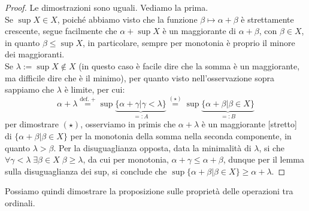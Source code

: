 \begin{proof}
	Le dimostrazioni sono uguali. Vediamo la prima.\\
	Se $\sup X \in X$, poich\'e abbiamo visto che la funzione $\beta \mapsto \alpha + \beta$ \`e strettamente crescente, segue facilmente che $\alpha + \sup X$ \`e un maggiorante di $\alpha + \beta$, con $\beta \in X$, in quanto $\beta \leq \sup X$, in particolare, sempre per monotonia \`e proprio il minore dei maggioranti.\\
	Se $\lambda := \sup X \not \in X$ (in questo caso \`e facile dire che la somma \`e un maggiorante, ma difficile dire che \`e il minimo), per quanto visto nell'osservazione sopra sappiamo che $\lambda$ \`e limite, per cui:
	\[ \alpha + \lambda \overset{\text{def. +}}{=} \sup\underbrace{\{\alpha + \gamma | \gamma < \lambda\}}_{=:A} \overset{(\star)}{=} \sup\underbrace{\{\alpha + \beta | \beta \in X\}}_{=:B}
		\]
	per dimostrare $(\star)$, osserviamo in primis che $\alpha + \lambda$ \`e un maggiorante [stretto] di $\{\alpha + \beta | \beta \in X\}$ per la monotonia della somma nella seconda componente, in quanto $\lambda > \beta$.
	Per la disuguaglianza opposta, data la minimalit\`a di $\lambda$, si che $\forall \gamma < \lambda \; \exists \beta \in X \; \beta \geq \lambda$, da cui per monotonia, $\alpha + \gamma \leq \alpha + \beta$, dunque per il lemma sulla disuguaglianza dei sup, si conclude che $\sup\{\alpha + \beta | \beta \in X\} \geq \alpha + \lambda$.
\end{proof}

Possiamo quindi dimostrare la proposizione sulle propriet\`a delle operazioni tra ordinali.


